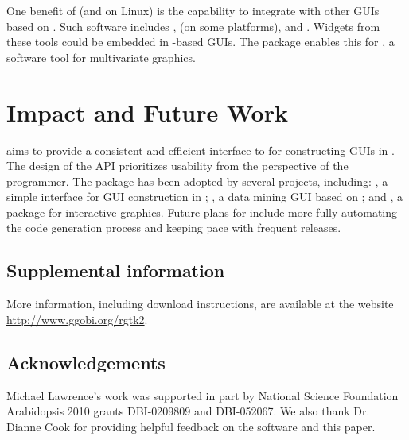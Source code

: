 \documentclass[article]{jss}
\begin{document}
One benefit of  (and  on Linux) is the capability to integrate with other GUIs based on .
Such software includes ,  (on some
platforms), and . Widgets from these tools could be embedded in -based GUIs. The  package enables this for , a software tool for multivariate graphics. 

\section{Impact and Future Work}

 aims to provide a consistent and efficient interface to
for constructing GUIs in . The design of the API
prioritizes
usability from the perspective of the  programmer.
The package has been adopted by several projects, including:
\citep{gWidgets}, a simple interface for GUI construction in
; 
 \citep{rattle}, a data mining GUI based on
; and 
 \citep{playwith}, a package for interactive
graphics. Future plans for  include more fully automating
the code 
generation process and keeping pace with frequent  releases.

\subsection*{Supplemental information}

More information, including download instructions,
are available at the  website
\url{http://www.ggobi.org/rgtk2}.

\subsection*{Acknowledgements}

Michael Lawrence's work was supported in part by National Science
Foundation Arabidopsis 2010 grants DBI-0209809 and DBI-052067. We also
thank Dr. Dianne Cook for providing helpful feedback on the software
and this paper.
\end{document}

